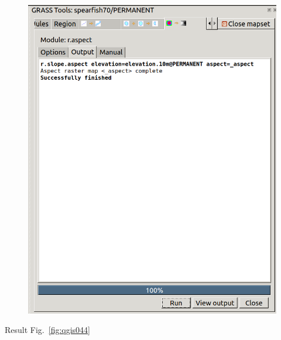 \begin{figure}[htbp]
   \centering
   \includegraphics[scale=0.3]{qgis043.png}
   \caption{}
   \label{fig:qgis043}
\end{figure}

Result Fig.~\ref{fig:qgis044}

